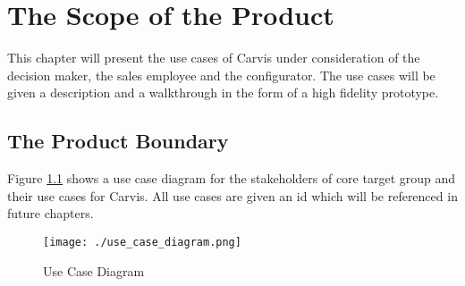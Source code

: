 \chapter{The Scope of the Product}
This chapter will present the use cases of Carvis under consideration of the decision maker, the sales employee and the configurator. The use cases will be given a description and a walkthrough in the form of a high fidelity prototype.
\section{The Product Boundary}
Figure \ref{SopeOfProduct:ContextDiagram} shows a use case diagram for the stakeholders of core target group and their use cases for Carvis. All use cases are given an id which will be referenced in future chapters.
\begin{figure}[H]
  \centering
  \texttt{[image: ./use\_case\_diagram.png]}
  \caption{Use Case Diagram}
  \label{SopeOfProduct:ContextDiagram}
\end{figure}

